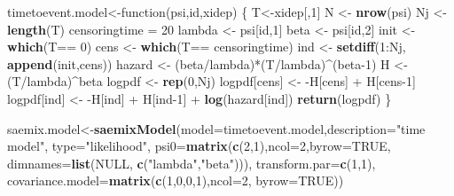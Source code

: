 \documentclass[]{book}
\newenvironment{Shaded}{\begin{snugshade}}{\end{snugshade}}
\newcommand{\KeywordTok}[1]{\textcolor[rgb]{0.13,0.29,0.53}{\textbf{{#1}}}}
\newcommand{\DataTypeTok}[1]{\textcolor[rgb]{0.13,0.29,0.53}{{#1}}}
\newcommand{\DecValTok}[1]{\textcolor[rgb]{0.00,0.00,0.81}{{#1}}}
\newcommand{\StringTok}[1]{\textcolor[rgb]{0.31,0.60,0.02}{{#1}}}
\newcommand{\OtherTok}[1]{\textcolor[rgb]{0.56,0.35,0.01}{{#1}}}
\newcommand{\NormalTok}[1]{{#1}}
\begin{document}
\begin{Shaded}
\begin{Highlighting}[]
\NormalTok{timetoevent.model<-function(psi,id,xidep) \{}
    \NormalTok{T<-xidep[,}\DecValTok{1}\NormalTok{]}
    \NormalTok{N <-}\StringTok{ }\KeywordTok{nrow}\NormalTok{(psi)}
    \NormalTok{Nj <-}\StringTok{ }\KeywordTok{length}\NormalTok{(T)}
    \NormalTok{censoringtime =}\StringTok{ }\DecValTok{20}
    \NormalTok{lambda <-}\StringTok{ }\NormalTok{psi[id,}\DecValTok{1}\NormalTok{]}
    \NormalTok{beta <-}\StringTok{ }\NormalTok{psi[id,}\DecValTok{2}\NormalTok{]}
    \NormalTok{init <-}\StringTok{ }\KeywordTok{which}\NormalTok{(T==}\StringTok{ }\DecValTok{0}\NormalTok{)}
    \NormalTok{cens <-}\StringTok{ }\KeywordTok{which}\NormalTok{(T==}\StringTok{ }\NormalTok{censoringtime)}
    \NormalTok{ind <-}\StringTok{ }\KeywordTok{setdiff}\NormalTok{(}\DecValTok{1}\NormalTok{:Nj, }\KeywordTok{append}\NormalTok{(init,cens))}
    \NormalTok{hazard <-}\StringTok{ }\NormalTok{(beta/lambda)*(T/lambda)^(beta}\DecValTok{-1}\NormalTok{)}
    \NormalTok{H <-}\StringTok{ }\NormalTok{(T/lambda)^beta}
    \NormalTok{logpdf <-}\StringTok{ }\KeywordTok{rep}\NormalTok{(}\DecValTok{0}\NormalTok{,Nj)}
    \NormalTok{logpdf[cens] <-}\StringTok{ }\NormalTok{-H[cens] +}\StringTok{ }\NormalTok{H[cens}\DecValTok{-1}\NormalTok{]}
    \NormalTok{logpdf[ind] <-}\StringTok{ }\NormalTok{-H[ind] +}\StringTok{ }\NormalTok{H[ind}\DecValTok{-1}\NormalTok{] +}\StringTok{ }\KeywordTok{log}\NormalTok{(hazard[ind])}
    \KeywordTok{return}\NormalTok{(logpdf) \}}


\NormalTok{saemix.model<-}\KeywordTok{saemixModel}\NormalTok{(}\DataTypeTok{model=}\NormalTok{timetoevent.model,}\DataTypeTok{description=}\StringTok{"time model"}\NormalTok{,}
  \DataTypeTok{type=}\StringTok{"likelihood"}\NormalTok{, }\DataTypeTok{psi0=}\KeywordTok{matrix}\NormalTok{(}\KeywordTok{c}\NormalTok{(}\DecValTok{2}\NormalTok{,}\DecValTok{1}\NormalTok{),}\DataTypeTok{ncol=}\DecValTok{2}\NormalTok{,}\DataTypeTok{byrow=}\OtherTok{TRUE}\NormalTok{,}
  \DataTypeTok{dimnames=}\KeywordTok{list}\NormalTok{(}\OtherTok{NULL}\NormalTok{, }\KeywordTok{c}\NormalTok{(}\StringTok{"lambda"}\NormalTok{,}\StringTok{"beta"}\NormalTok{))), }\DataTypeTok{transform.par=}\KeywordTok{c}\NormalTok{(}\DecValTok{1}\NormalTok{,}\DecValTok{1}\NormalTok{),}
  \DataTypeTok{covariance.model=}\KeywordTok{matrix}\NormalTok{(}\KeywordTok{c}\NormalTok{(}\DecValTok{1}\NormalTok{,}\DecValTok{0}\NormalTok{,}\DecValTok{0}\NormalTok{,}\DecValTok{1}\NormalTok{),}\DataTypeTok{ncol=}\DecValTok{2}\NormalTok{, }\DataTypeTok{byrow=}\OtherTok{TRUE}\NormalTok{))}
\end{Highlighting}
\end{Shaded}
\end{document}
